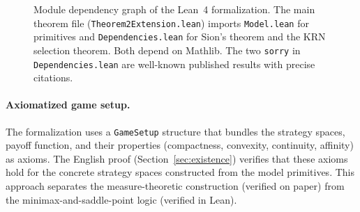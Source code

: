 \documentclass[11pt,a4paper]{article}
\theoremstyle{definition}
\newcommand{\sorry}{\texttt{sorry}}
\begin{document}
\begin{figure}[t]
\centering
{}
\caption{Module dependency graph of the Lean~4 formalization.
The main theorem file (\texttt{Theorem2Extension.lean}) imports \texttt{Model.lean} for primitives and \texttt{Dependencies.lean} for Sion's theorem and the KRN selection theorem.
Both depend on Mathlib.
The two \sorry{} in \texttt{Dependencies.lean} are well-known published results with precise citations.}
\label{fig:lean_arch}
\end{figure}

\paragraph{Axiomatized game setup.}
The formalization uses a \texttt{GameSetup} structure that bundles the strategy spaces, payoff function, and their properties (compactness, convexity, continuity, affinity) as axioms.
The English proof (Section~\ref{sec:existence}) verifies that these axioms hold for the concrete strategy spaces constructed from the model primitives.
This approach separates the measure-theoretic construction (verified on paper) from the minimax-and-saddle-point logic (verified in Lean).
\end{document}
